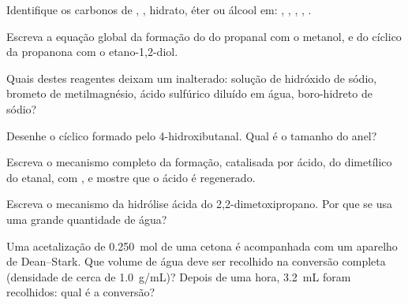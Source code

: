 \begin{exercise}[$\star$]\label{exo:b1:acetals-protection:1}
Identifique os carbonos de , , hidrato, éter ou álcool em:
, , , ,
.
\end{exercise}

\begin{exercise}[$\star$]\label{exo:b1:acetals-protection:2}
Escreva a equação global da formação do  do propanal com o
metanol, e do  cíclico da propanona com o etano-1,2-diol.
\end{exercise}

\begin{exercise}[$\star$]\label{exo:b1:acetals-protection:3}
Quais destes reagentes deixam um  inalterado: solução de hidróxido
de sódio, brometo de metilmagnésio, ácido sulfúrico diluído em água,
boro-hidreto de sódio?
\end{exercise}

\begin{exercise}[$\star$]\label{exo:b1:acetals-protection:4}
Desenhe o  cíclico formado pelo 4-hidroxibutanal. Qual é o
tamanho do anel?
\end{exercise}

\begin{exercise}[$\star\star$]\label{exo:b1:acetals-protection:5}
Escreva o mecanismo completo da formação, catalisada por ácido, do
 dimetílico do etanal, com , e mostre que o ácido é
regenerado.
\end{exercise}

\begin{exercise}[$\star\star$]\label{exo:b1:acetals-protection:6}
Escreva o mecanismo da hidrólise ácida do
2,2-dimetoxipropano. Por que se usa uma grande quantidade de água?
\end{exercise}

\begin{exercise}[$\star\star$]\label{exo:b1:acetals-protection:7}
Uma acetalização de \qty{0.250}{mol} de uma cetona é acompanhada com um
aparelho de Dean--Stark. Que volume de água deve ser recolhido na
conversão completa (densidade de cerca de \qty{1.0}{g/mL})? Depois de uma
hora, \qty{3.2}{mL} foram recolhidos: qual é a conversão?
\end{exercise}

